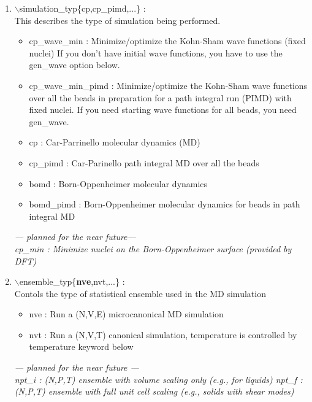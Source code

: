 \documentclass[12pt,titlepage]{article}
\begin{document}
\begin{enumerate}
 \vspace{0.15in}
 \item $\backslash$simulation\_typ\{cp,cp\_pimd,...\} : \\
     This describes the type of simulation being performed.
     \begin{itemize}
\item     cp\_wave\_min : Minimize/optimize the Kohn-Sham wave functions (fixed nuclei)
              If you don't have initial wave functions, you have to
	      use the gen\_wave option below.
\item cp\_wave\_min\_pimd : Minimize/optimize the Kohn-Sham wave functions
		   over all the beads in preparation for a path
		   integral run (PIMD) with fixed nuclei.  If you need
		   starting wave functions for all beads, you need gen\_wave.
\item cp : Car-Parrinello molecular dynamics (MD)
\item cp\_pimd : Car-Parinello path integral MD over all the beads
\item bomd : Born-Oppenheimer molecular dynamics
\item bomd\_pimd : Born-Oppenheimer molecular dynamics for beads in path integral MD
\end{itemize}
{\it
--- planned for the near future---\\
cp\_min : Minimize nuclei on the Born-Oppenheimer surface (provided by DFT)
}
 

 \vspace{0.15in} 
 \item  $\backslash$ensemble\_typ\{{\bf nve},nvt,...\} : \\
Contols the type of statistical ensemble used in the MD simulation
\begin{itemize}
\item nve : Run a (N,V,E) microcanonical MD simulation
\item nvt : Run a (N,V,T) canonical simulation, temperature is controlled by 
      temperature keyword below
\end{itemize}
{\it
--- planned for the near future ---\\
npt\_i : (N,P,T) ensemble with volume scaling only (e.g., for liquids)
npt\_f : (N,P,T) ensemble with full unit cell scaling  (e.g., solids
        with shear modes)
}



\end{enumerate}
\end{document}
